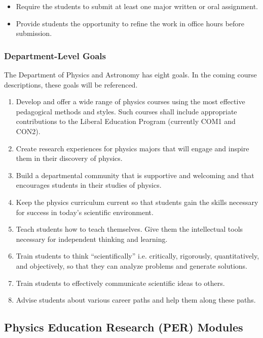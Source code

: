 \documentclass[../../../main.tex]{subfiles}
\begin{document}
\begin{enumerate}
\begin{itemize}
\item Require the students to submit at least one major written or oral assignment.
\item Provide students the opportunity to refine the work in office hours before submission.
\end{itemize}

\subsubsection{Department-Level Goals}

The Department of Physics and Astronomy has eight goals. In the coming course descriptions, these goals will be referenced.

\begin{enumerate}
\item Develop and offer a wide range of physics courses using the most effective pedagogical methods and styles.  Such courses shall include appropriate contributions to the Liberal Education Program (currently COM1 and CON2).
\item Create research experiences for physics majors that will engage and inspire them in their discovery of physics.
\item Build a departmental community that is supportive and welcoming and that encourages students in their studies of physics.
\item Keep the physics curriculum current so that students gain the skills necessary for success in today’s scientific environment.
\item Teach students how to teach themselves. Give them the intellectual tools necessary for independent thinking and learning.
\item Train students to think ``scientifically'' i.e. critically, rigorously, quantitatively, and objectively, so that they can analyze problems and generate solutions.
\item Train students to effectively communicate scientific ideas to others.
\item Advise students about various career paths and help them along these paths.
\end{enumerate}

\end{enumerate}

\subsection{Physics Education Research (PER) Modules}
\label{sec:per}
\end{document}
